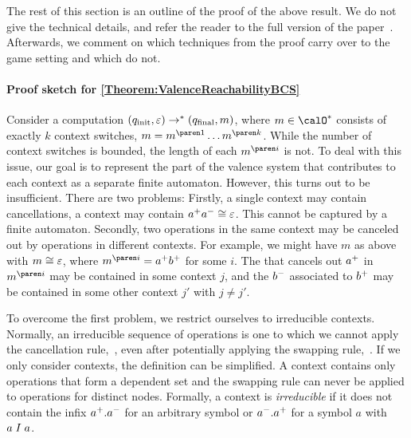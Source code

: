\documentclass[../../diss.tex]{subfiles}
\begin{document}
The rest of this section is an outline of the proof of the above result.
We do not give the technical details, and refer the reader to the full version of the paper~\cite{MeyerMZ18a}.
Afterwards, we comment on which techniques from the proof carry over to the game setting and which do not.

\paragraph{Proof sketch for \cref{Theorem:ValenceReachabilityBCS}}

Consider a computation $(q_{\text{init}},\varepsilon) \to^* (q_{\text{final}},m)$, where $m \in \ops^*$ consists of exactly $k$ context switches, $m = \itr{m}{1}\ldots\itr{m}{k}$.
While the number of context switches is bounded, the length of each $\itr{m}{i}$ is not.
To deal with this issue, our goal is to represent the part of the valence system that contributes to each context as a separate finite automaton.
However, this turns out to be insufficient.
There are two problems:
Firstly, a single context may contain cancellations, \ie a context may contain ${a}^+{a}^- \cong \varepsilon$.
This cannot be captured by a finite automaton.
Secondly, two operations in the same context may be canceled out by operations in different contexts.
For example, we might have $m$ as above with $m \cong \varepsilon$, where $\itr{m}{i} = \inc{a}\inc{b}$ for some $i$.
The  that cancels out ${a}^+$ in $\itr{m}{i}$ may be contained in some context $j$, and the ${b}^-$ associated to ${b}^+$ may be contained in some other context $j'$ with $j \neq j'$.

To overcome the first problem, we restrict ourselves to irreducible contexts.
Normally, an irreducible sequence of operations is one to which we cannot apply the cancellation rule,~\RuleCancel, even after potentially applying the swapping rule,~\RuleSwap.
If we only consider contexts, the definition can be simplified.
A context contains only operations that form a dependent set and the swapping rule can never be applied to operations for distinct nodes.
Formally, a context is \emph{irreducible} if it does not contain the infix ${a}^+.{a}^-$ for an arbitrary symbol or ${a}^-.{a}^+$ for a symbol $a$ with $a \mathrel{I} a$.
\end{document}
